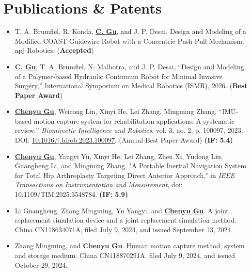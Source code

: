 \documentclass[letterpaper,11pt]{article}
\newcommand{\resumeItem}[1]{
  \item\small{
    {#1 \vspace{-2pt}}
  }
}
\newcommand{\resumeItemListStart}{\begin{itemize}}
\newcommand{\resumeItemListEnd}{\end{itemize}\vspace{-5pt}}
\begin{document}
\section{Publications \& Patents}
\vspace{3pt}
\resumeItemListStart
  \resumeItem{T. A. Brumfiel, R. Konda, \textbf{\underline{C. Gu}}, and J. P. Desai. Design and Modeling of a Modified COAST Guidewire Robot with a Concentric Push-Pull Mechanism. npj Robotics. (\textbf{Accepted})
}
\vspace{-5pt}
  \resumeItem{\textbf{\underline{C. Gu}}, T. A. Brumfiel, N. Malhotra, and J. P. Desai, “Design and Modeling of a Polymer-based Hydraulic Continuum Robot for Minimal Invasive Surgery,” International Symposium on Medical Robotics (ISMR), 2026. (\textbf{Best Paper Award})
}
\vspace{-5pt}
  \resumeItem{
    \textbf{\underline{Chenyu Gu}}, Weicong Lin, Xinyi He, Lei Zhang, Mingming Zhang, “IMU-based motion capture system for rehabilitation applications: A systematic
    review,” \textit{Biomimetic Intelligence and Robotics}, vol. 3, no. 2, p. 100097, 2023. DOI: \href{https://doi.org/10.1016/j.birob.2023.100097}{10.1016/j.birob.2023.100097}. (Annual Best Paper Award) \textbf{(IF: 5.4)}
  }
\vspace{-5pt}
  \resumeItem{
  \textbf{\underline{Chenyu Gu}}, Yangyi Yu, Xinyi He, Lei Zhang, Zhen Xi, Yudong Liu, Guangheng Li, and Mingming Zhang, "A Portable Inertial Navigation System for Total Hip Arthroplasty Targeting Direct Anterior Approach," in \textit{IEEE Transactions on Instrumentation and Measurement}, doi: 10.1109/TIM.2025.3548784. \textbf{(IF: 5.9)}
  }
\vspace{-5pt}
    \resumeItem{
Li Guangheng, Zhang Mingming, Yu Yangyi, and \textbf{\underline{Chenyu Gu}}. A joint replacement simulation device and a joint replacement simulation method. China CN118634071A, filed July 9, 2024, and issued September 13, 2024. 
  }
\vspace{-5pt}
  \resumeItem{
    Zhang Mingming, and \textbf{\underline{Chenyu Gu}}. Human motion capture method, system and storage medium. China CN118870291A, filed July 9, 2024, and issued October 29, 2024. 
  }
\vspace{-5pt}
\resumeItemListEnd
\vspace{-5pt}
\vspace{-5pt}
\end{document}
